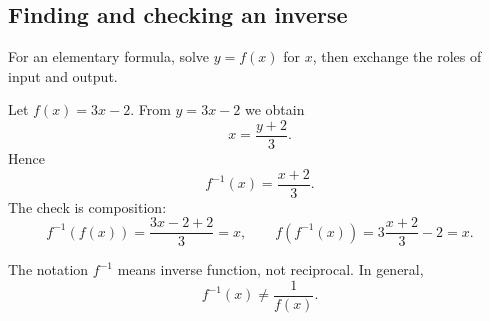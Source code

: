\subsection{Finding and checking an inverse}

For an elementary formula, solve \(y=f(x)\) for \(x\), then exchange the roles of input and output.

\begin{examplebox}
Let \(f(x)=3x-2\). From \(y=3x-2\) we obtain
\[
x=\frac{y+2}{3}.
\]
Hence
\[
f^{-1}(x)=\frac{x+2}{3}.
\]
The check is composition:
\[
f^{-1}(f(x))=\frac{3x-2+2}{3}=x,
\qquad
f(f^{-1}(x))=3\frac{x+2}{3}-2=x.
\]
\end{examplebox}

\begin{remarkbox}
The notation \(f^{-1}\) means inverse function, not reciprocal. In general,
\[
f^{-1}(x)\ne\frac1{f(x)}.
\]
\end{remarkbox}
